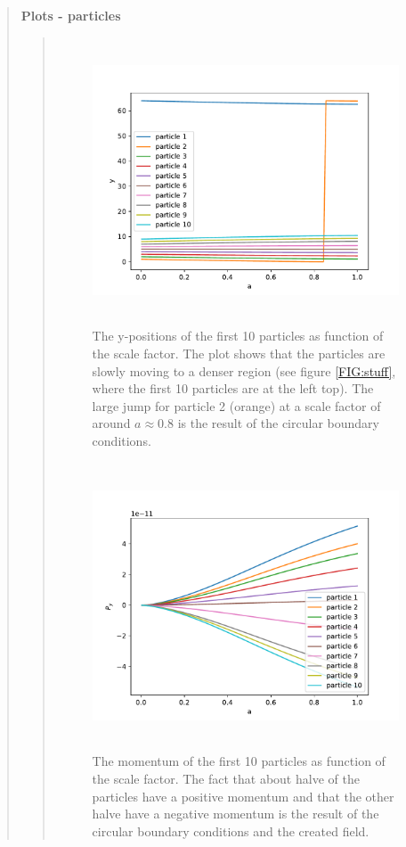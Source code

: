\begin{quote}
\textbf{Plots - particles}
\begin{quote}
\begin{figure}[!ht]
\centering
\includegraphics[width=14cm, height=8.5cm]{./Plots/4c_pos.pdf}
\caption{The y-positions of the first 10 particles as function of the scale factor. The plot shows that the particles are slowly moving to a denser region (see figure \ref{FIG:stuff}, where the first 10 particles are at the left top). The large jump for particle 2 (orange) at a scale factor of around $ a \approx 0.8$ is the result of the circular boundary conditions.  }
\end{figure}

\begin{figure}[!ht]
\centering
\includegraphics[width=14cm, height=8.5cm]{./Plots/4c_momentum.pdf}
\caption{The momentum of the first 10 particles as function of the scale factor. The fact that about halve of the particles have a positive momentum and that the other halve have a negative momentum is the result of the circular boundary conditions and the created field.  }
\end{figure}
\end{quote}
\end{quote}





